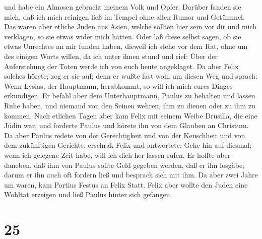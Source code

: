 und habe ein Almosen gebracht meinem Volk und Opfer. 
Darüber fanden sie mich, daß ich mich reinigen ließ im Tempel ohne allen
Rumor und Getümmel.  Das waren aber etliche Juden aus
Asien, welche sollten hier sein vor dir und mich verklagen, so sie etwas
wider mich hätten.  Oder laß diese selbst sagen, ob sie
etwas Unrechtes an mir funden haben, dieweil ich stehe vor dem Rat,
 ohne um des einigen Worts willen, da ich unter ihnen stund
und rief: Über der Auferstehung der Toten werde ich von euch heute
angeklaget.  Da aber Felix solches hörete; zog er sie auf;
denn er wußte fast wohl um diesen Weg und sprach: Wenn Lysias, der
Hauptmann, herabkommt, so will ich mich eures Dinges erkundigen.
 Er befahl aber dem Unterhauptmann, Paulus zu behalten und
lassen Ruhe haben, und niemand von den Seinen wehren, ihm zu dienen oder
zu ihm zu kommen.  Nach etlichen Tagen aber kam Felix mit
seinem Weibe Drusilla, die eine Jüdin war, und forderte Paulus und
hörete ihn von dem Glauben an Christum.  Da aber Paulus
redete von der Gerechtigkeit und von der Keuschheit und von dem
zukünftigen Gerichte, erschrak Felix und antwortete: Gehe hin auf
diesmal; wenn ich gelegene Zeit habe, will ich dich her lassen rufen.
 Er hoffte aber daneben, daß ihm von Paulus sollte Geld
gegeben werden, daß er ihn losgäbe; darum er ihn auch oft fordern ließ
und besprach sich mit ihm.  Da aber zwei Jahre um waren,
kam Portius Festus an Felix Statt. Felix aber wollte den Juden eine
Wohltat erzeigen und ließ Paulus hinter sich gefangen.

\hypertarget{section-24}{%
\section{25}\label{section-24}}

